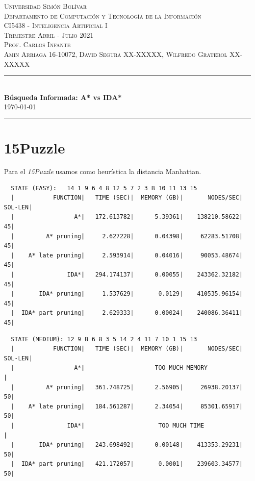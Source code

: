 \documentclass[a4paper,10pt]{article}
\date{}
\newcommand{\HRule}{\rule{\linewidth}{0.5mm}}
\begin{document}
\begin{center}
  \textsc {
    Universidad Simón Bolívar \\[0cm]
    Departamento de Computaci\'on y Tecnolog\'ia de la Informaci\'on \\[0cm]
    CI5438 - Inteligencia Artificial I \\[0cm]
    Trimestre Abril - Julio 2021 \\[0cm]
    Prof. Carlos Infante \\[0cm]
    Amin Arriaga 16-10072, David Segura XX-XXXXX, Wilfredo Graterol XX-XXXXX
  }
  \HRule \\[0.4cm]
  {\Large \textbf{B\'usqueda Informada: A* vs IDA*}} \\[0.4cm]
  \textsc{
    \today
  }
  \HRule
\end{center}

\section{15Puzzle}
  Para el \textit{15Puzzle} usamos como heur\'istica la distancia Manhattan.

  
  \begin{verbatim}
  STATE (EASY):   14 1 9 6 4 8 12 5 7 2 3 B 10 11 13 15
  |           FUNCTION|   TIME (SEC)|  MEMORY (GB)|       NODES/SEC|    SOL-LEN|
  |                 A*|   172.613782|      5.39361|    138210.58622|         45|
  |         A* pruning|     2.627228|      0.04398|     62283.51708|         45|
  |    A* late pruning|     2.593914|      0.04016|     90053.48674|         45|
  |               IDA*|   294.174137|      0.00055|    243362.32182|         45|
  |       IDA* pruning|     1.537629|       0.0129|    410535.96154|         45|
  |  IDA* part pruning|     2.629333|      0.00024|    240086.36411|         45|
  \end{verbatim}        
  
  \begin{verbatim}  
  STATE (MEDIUM): 12 9 B 6 8 3 5 14 2 4 11 7 10 1 15 13                                                                                       
  |           FUNCTION|   TIME (SEC)|  MEMORY (GB)|       NODES/SEC|    SOL-LEN|
  |                 A*|                    TOO MUCH MEMORY                     |
  |         A* pruning|   361.748725|      2.56905|     26938.20137|         50|
  |    A* late pruning|   184.561287|      2.34054|     85301.65917|         50|
  |               IDA*|                     TOO MUCH TIME                      |
  |       IDA* pruning|   243.698492|      0.00148|    413353.29231|         50|
  |  IDA* part pruning|   421.172057|       0.0001|    239603.34577|         50|
  \end{verbatim}
\end{document}
